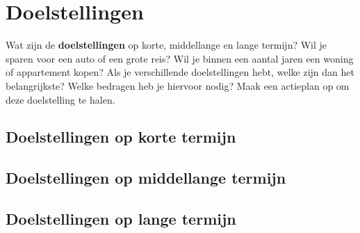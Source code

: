 \endgroup



\section{Doelstellingen}

Wat zijn de \textbf{doelstellingen} op korte, middellange en lange termijn? Wil je sparen
voor een auto of een grote reis? Wil je binnen een aantal jaren een woning of
appartement kopen? Als je verschillende doelstellingen hebt, welke zijn dan het
belangrijkste? Welke bedragen heb je hiervoor nodig? Maak een actieplan op om
deze doelstelling te halen.

\subsection{Doelstellingen op korte termijn}

\lipsum[1-5]

\subsection{Doelstellingen op middellange termijn}

\lipsum[1-5]

\subsection{Doelstellingen op lange termijn}

\lipsum[1-5]




